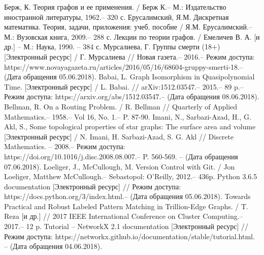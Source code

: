 

\begin{thebibliography}{}
	  Берж, К. Теория графов и ее применения. / Берж К.-- М.: Издательство иностранной литературы, 1962.-- 320 с.
	  Ерусалимский, Я.М. Дискретная математика. Теория, задачи, приложения: учеб. пособие / Я.М. Ерусалимский.-- М.: Вузовская книга, 2009.-- 288 с.
	 Лекции по теории графов. / Емеличев В. А. [и др.] -- М.: Наука, 1990. -- 384 с.	
	  Мурсалиева, Г. Группы смерти (18+) [Электронный ресурс] / Г. Мурсалиева // Новая газета.-- 2016.-- Режим доступа: https://www.novayagazeta.ru/articles/2016/05/16/68604-gruppy-smerti-18.-- (Дата обращения 05.06.2018).
	 Babai, L. Graph Isomorphism in Quasipolynomial Time. [Электронный ресурс] / L. Babai. // arXiv:1512.03547.-- 2015.-- 89 p.-- Режим доступа: https://arxiv.org/abs/1512.03547.-- (Дата обращения 08.06.2018).
	 Bellman, R. On a Routing Problem. / R. Bellman // Quarterly of Applied Mathematics.-- 1958.-- Vol 16, No. 1.-- P. 87-90.
	  Imani, N., Sarbazi-Azad, H., G. Akl, S., Some topological properties of star graphs: The surface area and volume [Электронный ресурс] / N. Imani, H. Sarbazi-Azad, S. G. Akl // Discrete Mathematics. -- 2008.-- Режим доступа: https://doi.org/10.1016/j.disc.2008.08.007.-- P. 560-569. -- (Дата обращения 07.06.2018).
	 Loeliger, J., McCullough, M. Version Control with Git. / Jon Loeliger, Matthew McCullough.-- Sebastopol: O'Reilly, 2012.-- 436p.
	 Python 3.6.5 documentation [Электронный ресурс] // Режим доступа: https://docs.python.org/3/index.html.-- (Дата обращения 05.06.2018).
	 Towards Practical and Robust Labeled Pattern Matching in Trillion-Edge Graphs. / T. Reza [и др.] // 2017 IEEE International Conference on Cluster Computing.-- 2017.-- 12 p.
	 Tutorial -- NetworkX 2.1 documentation [Электронный ресурс] // Режим доступа: https://networkx.github.io/documentation/stable/tutorial.html. -- (Дата обращения 04.06.2018).
\end{thebibliography}
